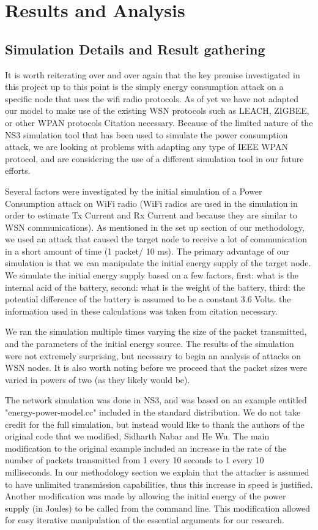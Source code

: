 \section{Results and Analysis}

\subsection{Simulation Details and Result gathering}
It is worth reiterating over and over again that the key premise investigated in this project up to this point is the simply 
energy consumption attack on a specific node that uses the wifi radio protocols. As of yet we have not adapted our model to 
make use of the existing WSN protocols such as LEACH, ZIGBEE, or other WPAN protocols {Citation necessary}. Because of the 
limited nature of the NS3 simulation tool that has been used to simulate the power consumption attack, we are looking at 
problems with adapting any type of IEEE WPAN protocol, and are considering the use of a different simulation tool in our future efforts. 


Several factors were investigated by the initial simulation of a Power Consumption attack on WiFi radio 
(WiFi radios are used in the simulation in order to estimate Tx Current and Rx Current and because they are similar to WSN communications).
As mentioned in the set up section of our methodology, we used an attack that caused the target node to receive a lot of communication 
in a short amount of time (1 packet/ 10 ms). The primary advantage of our simulation is that we can manipulate the initial energy 
supply of the target node. We simulate the initial energy supply based on a few factors, first: what is the internal acid of the 
battery, second: what is the weight of the battery, third: the potential difference of the battery is assumed to be a constant 3.6 Volts. 
the information used in these calculations was taken from {citation necessary}.

We ran the simulation multiple times varying the size of the packet transmitted, and the parameters of the initial energy source. The 
results of the simulation were not extremely surprising, but necessary to begin an analysis of attacks on WSN nodes. It is also worth
noting before we proceed that the packet sizes were varied in powers of two (as they likely would be). 

The network simulation was done in NS3, and was based on an example entitled "energy-power-model.cc" included in the standard distribution.
We do not take credit for the full simulation, but instead would like to thank the authors of the original code that we modified, 
Sidharth Nabar and He Wu. The main modification to the original example included an increase in the rate of the number of packets 
transmitted from 1 every 10 seconds to 1 every 10 milliseconds. In our methodology section we explain that the attacker is assumed to have
unlimited transmission capabilities, thus this increase in speed is justified. Another modification was made by allowing the initial energy
of the power supply (in Joules) to be called from the command line. This modification allowed for easy iterative manipulation of the 
essential arguments for our research. 

